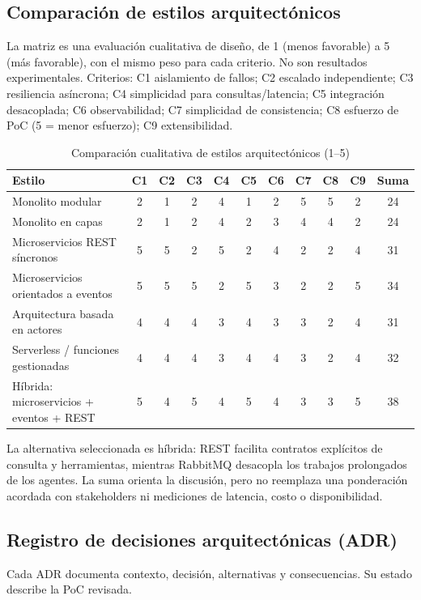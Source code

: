 \documentclass[12pt,oneside]{report}
\begin{document}
\subsection{Comparación de estilos arquitectónicos}
La matriz es una evaluación cualitativa de diseño, de 1 (menos favorable) a 5 (más favorable), con el mismo peso para cada criterio. No son resultados experimentales. Criterios: C1 aislamiento de fallos; C2 escalado independiente; C3 resiliencia asíncrona; C4 simplicidad para consultas/latencia; C5 integración desacoplada; C6 observabilidad; C7 simplicidad de consistencia; C8 esfuerzo de PoC (5 = menor esfuerzo); C9 extensibilidad.

\begin{landscape}
\begin{table}[p]
\centering\scriptsize
\caption{Comparación cualitativa de estilos arquitectónicos (1--5)}
\begin{tabular}{p{4.0cm}ccccccccc c}
\toprule
Estilo & C1 & C2 & C3 & C4 & C5 & C6 & C7 & C8 & C9 & Suma \\
\midrule
Monolito modular & 2 & 1 & 2 & 4 & 1 & 2 & 5 & 5 & 2 & 24 \\
Monolito en capas & 2 & 1 & 2 & 4 & 2 & 3 & 4 & 4 & 2 & 24 \\
Microservicios REST síncronos & 5 & 5 & 2 & 5 & 2 & 4 & 2 & 2 & 4 & 31 \\
Microservicios orientados a eventos & 5 & 5 & 5 & 2 & 5 & 3 & 2 & 2 & 5 & 34 \\
Arquitectura basada en actores & 4 & 4 & 4 & 3 & 4 & 3 & 3 & 2 & 4 & 31 \\
Serverless / funciones gestionadas & 4 & 4 & 4 & 3 & 4 & 4 & 3 & 2 & 4 & 32 \\
Híbrida: microservicios + eventos + REST & 5 & 4 & 5 & 4 & 5 & 4 & 3 & 3 & 5 & 38 \\
\bottomrule
\end{tabular}
\end{table}
\end{landscape}

La alternativa seleccionada es híbrida: REST facilita contratos explícitos de consulta y herramientas, mientras RabbitMQ desacopla los trabajos prolongados de los agentes. La suma orienta la discusión, pero no reemplaza una ponderación acordada con stakeholders ni mediciones de latencia, costo o disponibilidad.

\subsection{Registro de decisiones arquitectónicas (ADR)}
Cada ADR documenta contexto, decisión, alternativas y consecuencias. Su estado describe la PoC revisada.
\end{document}

